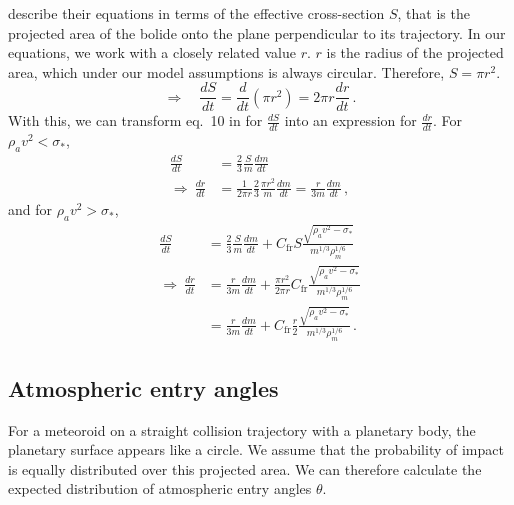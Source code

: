 \cite{avramenko2014simulation} describe their equations in terms of the effective cross-section $S$, that is the projected area of the bolide onto the plane perpendicular to its trajectory. In our equations, we work with a closely related value $r$. $r$ is the radius of the projected area, which under our model assumptions is always circular. Therefore, $S = \pi r^2$.
\begin{equation}
    \Rightarrow \quad \frac{dS}{dt} = \frac{d}{dt}\left(\pi r^2\right) = 2\pi r \frac{dr}{dt}\,.
\end{equation}
With this, we can transform eq.~10 in \cite{avramenko2014simulation} for $\frac{dS}{dt}$ into an expression for $\frac{dr}{dt}$.
For $\rho_a v^2 < \sigma_*$,
\begin{align}
    \frac{dS}{dt} &= \frac{2}{3} \frac{S}{m} \frac{dm}{dt} \nonumber\\
    \Rightarrow\ \frac{dr}{dt} &= \frac{1}{2\pi r} \frac{2}{3} \frac{\pi r^2}{m} \frac{dm}{dt} = \frac{r}{3m} \frac{dm}{dt}\,,
\end{align}
and for $\rho_a v^2 > \sigma_*$,
\begin{align}
    \frac{dS}{dt} &= \frac{2}{3} \frac{S}{m} \frac{dm}{dt} + C_\mathrm{fr}S\frac{\sqrt{\rho_a v^2 - \sigma_*}}{m^{1/3}\rho_m^{1/6}} \nonumber\\
    \Rightarrow\ \frac{dr}{dt} &= \frac{r}{3m} \frac{dm}{dt} + \frac{\pi r^2}{2\pi r} C_\mathrm{fr}\frac{\sqrt{\rho_a v^2 - \sigma_*}}{m^{1/3}\rho_m^{1/6}} \nonumber\\
    &= \frac{r}{3m} \frac{dm}{dt} +  C_\mathrm{fr} \frac{r}{2} \frac{\sqrt{\rho_a v^2 - \sigma_*}}{m^{1/3}\rho_m^{1/6}}\,.
\end{align}

\subsection{Atmospheric entry angles}
For a meteoroid on a straight collision trajectory with a planetary body, the planetary surface appears like a circle. We assume that the probability of impact is equally distributed over this projected area. We can therefore calculate the expected distribution of atmospheric entry angles $\theta$.

